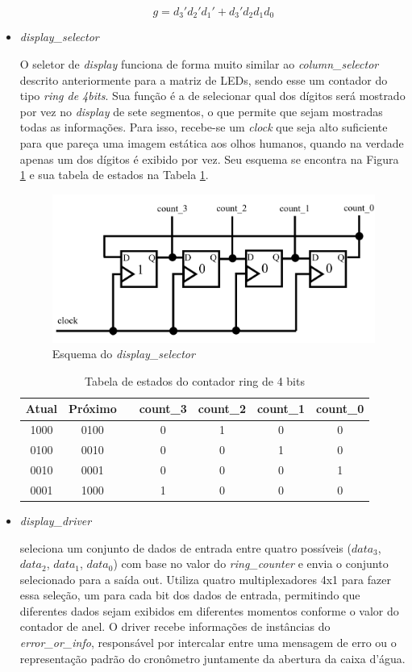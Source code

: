 \documentclass[
	article,			%
	11pt,				%
	oneside,			%
	a4paper,			%
	english,			%
	brazil,				%
	sumario=tradicional
	]{abntex2}
\begin{document}
\begin{itemize}
$$
g = d_3'd_2'd_1' + d_3'd_2d_1d_0
$$

    \item \textit{display\_selector}

O seletor de \textit{display} funciona de forma muito similar ao \textit{column\_selector} descrito anteriormente para a matriz de LEDs, sendo esse um contador do tipo \textit{ring de 4bits}. Sua função é a de selecionar qual dos dígitos será mostrado por vez no \textit{display} de sete segmentos, o que permite que sejam mostradas todas as informações. Para isso, recebe-se um \textit{clock} que seja alto suficiente para que pareça uma imagem estática aos olhos humanos, quando na verdade apenas um dos dígitos é exibido por vez. Seu esquema se encontra na Figura \ref{fig:display-selector} e sua tabela de estados na Tabela \ref{tab:4bits-ring}.

\begin{figure}[H]
    \centering
    \includegraphics[width=0.5\linewidth]{display_selector.png}
    \caption{Esquema do \textit{display\_selector}}
    \label{fig:display-selector}
\end{figure}

\begin{table}[H]
    \centering
    \begin{tabular}{|c|c|>{\centering\arraybackslash}p{2mm}|c|c|c|c|} \hline 
         Atual&  Próximo&  & count_3& count_2& count_1&count_0\\ \hline 
         1000&  0100&  & 0 & 1& 0&0\\ \hline 
         0100&  0010&  & 0& 0& 1&0\\ \hline 
         0010&  0001&  & 0& 0& 0&1\\ \hline 
         0001&  1000&  & 1 & 0& 0&0\\ \hline
    \end{tabular}
    \caption{Tabela de estados do contador ring de 4 bits}
    \label{tab:4bits-ring}
\end{table}

    \item \textit{display\_driver}

    seleciona um conjunto de dados de entrada entre quatro possíveis ($data_3$, $data_2$, $data_1$, $data_0$) com base no valor do \textit{ring\_counter} e envia o conjunto selecionado para a saída out. Utiliza quatro multiplexadores 4x1 para fazer essa seleção, um para cada bit dos dados de entrada, permitindo que diferentes dados sejam exibidos em diferentes momentos conforme o valor do contador de anel. O driver recebe informações de instâncias do \textit{error\_or\_info}, responsável por intercalar entre uma mensagem de erro ou o representação padrão do cronômetro juntamente da abertura da caixa d'água.


\end{itemize}
\end{document}
